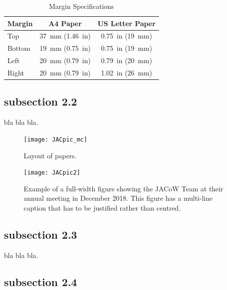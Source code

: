 \documentclass[letter,
               biblatex,     %
               keeplastbox,   %
               ]{jacow}
\begin{document}
\begin{table}[!hbt]
   \centering
   \caption{Margin Specifications}
   \begin{tabular}{lcc}
       \toprule
       \textbf{Margin} & \textbf{A4 Paper}                      & \textbf{US Letter Paper} \\
       \midrule
           Top         & \SI{37}{mm} (\SI{1.46}{in})            & \SI{0.75}{in} (\SI{19}{mm})        \\ %
          Bottom       & \SI{19}{mm} (\SI{0.75}{in})            & \SI{0.75}{in} (\SI{19}{mm})        \\ %
           Left        & \SI{20}{mm} (\SI{0.79}{in})            & \SI{0.79}{in} (\SI{20}{mm})        \\ %
           Right       & \SI{20}{mm} (\SI{0.79}{in})            & \SI{1.02}{in} (\SI{26}{mm})        \\
       \bottomrule
   \end{tabular}
   \label{tab:margins}
\end{table}

\subsection{subsection 2.2}
bla bla bla.

\begin{figure}[!htb]
   \centering
   \texttt{[image: JACpic\_mc]}
   \caption{Layout of papers.}
   \label{fig:paper_layout}
\end{figure}

\begin{figure}[!tbh]
    \centering
    \texttt{[image: JACpic2]}

    \caption{Example of a full-width figure showing the JACoW Team at their annual
    	     meeting in December 2018. This figure has a multi-line caption that has to be
    	     justified rather than centred.} %
    \label{fig:jacow_team}
\end{figure}

\subsection{subsection 2.3}

bla bla bla.

\subsection{subsection 2.4}
\end{document}
